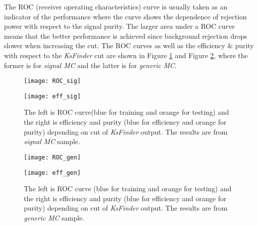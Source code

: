 The ROC (receiver operating characteristics) curve is usually taken as an indicator of the performance where the curve shows the dependence of rejection power with respect to the signal purity. The larger area under a ROC curve means that the better performance is achieved since background rejection drops slower when increasing the cut. The ROC curves as well as  the efficiency \& purity with respect to the  \textit{KsFinder} cut are shown in Figure \ref{fig:3Ks_performance}  and Figure  \ref{fig:gen_performance}, where the former is for \textit{signal MC} and the latter is for \textit{generic MC}.

\begin{figure}[htpb]
	\begin{minipage}[b]{0.5\linewidth}
		\centering 
		\texttt{[image: ROC\_sig]}
		\label{fig:ROC_3Ks}
	\end{minipage}
	\begin{minipage}[b]{0.5\linewidth}
		\centering 
		\texttt{[image: eff\_sig]}
		\label{fig:eff_3Ks}
	\end{minipage}
\caption{The left is ROC curve(blue for training and orange for testing) and the right is efficiency and purity (blue for efficiency and orange for purity) depending on cut of \textit{KsFinder} output. The results are from \textit{signal MC} sample.}
\label{fig:3Ks_performance}
\end{figure}

\begin{figure}[htpb]
	\begin{minipage}[b]{0.5\linewidth}
		\centering 
		\texttt{[image: ROC\_gen]}
	\end{minipage}
	\begin{minipage}[b]{0.5\linewidth}
		\centering 
		\texttt{[image: eff\_gen]}
	\end{minipage}
	\caption{The left is ROC curve (blue for training and orange for testing) and the right is efficiency and purity (blue for efficiency and orange for purity) depending on cut of \textit{KsFinder} output. The results are from \textit{generic MC} sample.}
	\label{fig:gen_performance}
\end{figure}

